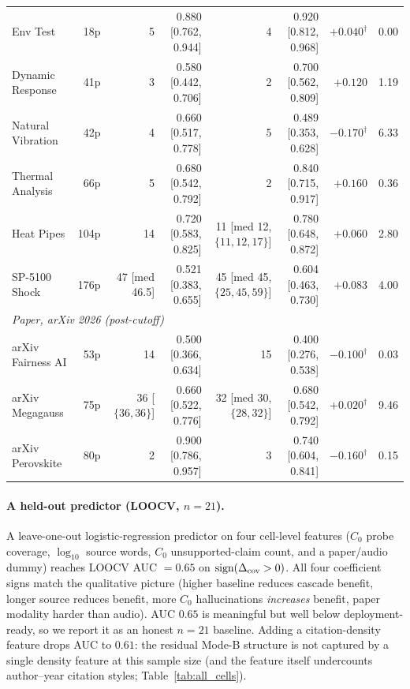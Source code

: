 \documentclass[11pt]{article}
\begin{document}
\begin{table}[h]
{\begin{tabular}{lrrrrrrr}
Env Test              &  18p & 5  & 0.880 [0.762, 0.944] & 4  & 0.920 [0.812, 0.968] & $+0.040^{\dagger}$ & 0.00 \\
Dynamic Response      &  41p & 3  & 0.580 [0.442, 0.706] & 2  & 0.700 [0.562, 0.809] & $+0.120$ & 1.19 \\
Natural Vibration     &  42p & 4  & 0.660 [0.517, 0.778] & 5  & 0.489 [0.353, 0.628] & $-0.170^{\dagger}$ & 6.33 \\
Thermal Analysis      &  66p & 5  & 0.680 [0.542, 0.792] & 2  & 0.840 [0.715, 0.917] & $+0.160$ & 0.36 \\
Heat Pipes            & 104p & 14 & 0.720 [0.583, 0.825] & 11 [med 12, $\{11,12,17\}$] & 0.780 [0.648, 0.872] & $+0.060$ & 2.80 \\
SP-5100 Shock         & 176p & 47 [med 46.5] & 0.521 [0.383, 0.655] & 45 [med 45, $\{25,45,59\}$] & 0.604 [0.463, 0.730] & $+0.083$ & 4.00 \\
\midrule
\multicolumn{8}{l}{\emph{Paper, arXiv 2026 (post-cutoff)}} \\
arXiv Fairness AI     &  53p & 14 & 0.500 [0.366, 0.634] & 15 & 0.400 [0.276, 0.538] & $-0.100^{\dagger}$ & 0.03 \\
arXiv Megagauss       &  75p & 36 [$\{36,36\}$] & 0.660 [0.522, 0.776] & 32 [med 30, $\{28,32\}$] & 0.680 [0.542, 0.792] & $+0.020^{\dagger}$ & 9.46 \\
arXiv Perovskite      &  80p & 2  & 0.900 [0.786, 0.957] & 3  & 0.740 [0.604, 0.841] & $-0.160^{\dagger}$ & 0.15 \\
\bottomrule
\end{tabular}%
}
\end{table}

\paragraph{A held-out predictor (LOOCV, $n{=}21$).}
A leave-one-out logistic-regression predictor on four cell-level features ($C_0$ probe coverage, $\log_{10}$ source words, $C_0$ unsupported-claim count, and a paper/audio dummy) reaches LOOCV AUC $= 0.65$ on $\text{sign}(\Delta_{\rm cov}>0)$. All four coefficient signs match the qualitative picture (higher baseline reduces cascade benefit, longer source reduces benefit, more $C_0$ hallucinations \emph{increases} benefit, paper modality harder than audio). AUC $0.65$ is meaningful but well below deployment-ready, so we report it as an honest $n{=}21$ baseline. Adding a citation-density feature drops AUC to $0.61$: the residual Mode-B structure is not captured by a single density feature at this sample size (and the feature itself undercounts author--year citation styles; Table~\ref{tab:all_cells}).
\end{document}
